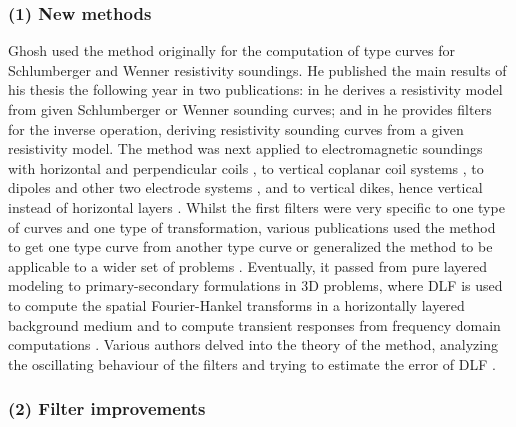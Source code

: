 \documentclass[paper,twocolumn,twoside]{geophysics}
\begin{document}
\subsubsection{(1) New methods}

Ghosh used the method originally for the computation of type curves for
Schlumberger and Wenner resistivity soundings. He published the main results of
his thesis the following year in two publications: in \cite{GP.71.Ghosh} he
derives a resistivity model from given Schlumberger or Wenner sounding curves;
and in \cite{GP.71.Ghoshb} he provides filters for the inverse operation,
deriving resistivity sounding curves from a given resistivity model.  The
method was next applied to electromagnetic soundings with horizontal and
perpendicular coils \citep{GP.72.Koefoed}, to vertical coplanar coil systems
\citep{GP.73.Verma}, to dipoles and other two electrode systems
\citep{GP.74.Das, GP.74.Dasb, GP.80.Das, GEO.94.Sorensen}, and to vertical
dikes, hence vertical instead of horizontal layers \citep{GEO.75.Niwas}. Whilst
the first filters were very specific to one type of curves and one type of
transformation, various publications used the method to get one type curve from
another type curve \citep{GP.77.Kumar, GP.78.Kumar} or generalized the method
to be applicable to a wider set of problems \citep{EXG.80.Davis, GXP.81.Das,
GEO.84.Das, GP.84.ONeill}. Eventually, it passed from pure layered modeling to
primary-secondary formulations in 3D problems, where DLF is used to compute the
spatial Fourier-Hankel transforms in a horizontally layered background medium
and to compute transient responses from frequency domain computations
\citep{GJI.81.Das, GJI.82.Das, GEO.84.Anderson, GEO.86.Newman,
MGS.17.Kruglyakov}. Various authors delved into the theory of the method,
analyzing the oscillating behaviour of the filters and trying to estimate the
error of DLF \citep{GP.72.Koefoedb, GP.76.Koefoedb, GP.79.Johansen,
GP.90.Christensen}.

\subsubsection{(2) Filter improvements}
\end{document}

